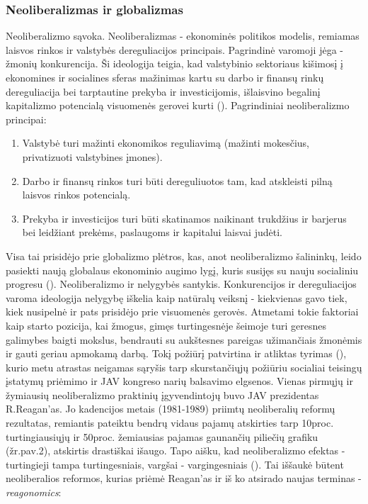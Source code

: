 \documentclass[12pt,a4paper,titlepage]{article}
\begin{document}
\subsubsection{Neoliberalizmas ir globalizmas}
Neoliberalizmo sąvoka. Neoliberalizmas - ekonominės politikos modelis, remiamas laisvos rinkos ir valstybės dereguliacijos principais. Pagrindinė varomoji jėga - žmonių konkurencija. Ši ideologija teigia, kad valstybinio sektoriaus kišimosį į ekonomines ir socialines sferas mažinimas kartu su darbo ir finansų rinkų dereguliacija bei tarptautine prekyba ir investicijomis, išlaisvino begalinį kapitalizmo potencialą visuomenės gerovei kurti (\cite{navarro2007neoliberalism}).
Pagrindiniai neoliberalizmo principai:
\begin{enumerate}
\item Valstybė turi mažinti ekonomikos reguliavimą (mažinti mokesčius, privatizuoti valstybines įmones).
\item Darbo ir finansų rinkos turi būti dereguliuotos tam, kad atskleisti pilną laisvos rinkos potencialą.
\item Prekyba ir investicijos turi būti skatinamos naikinant trukdžius ir barjerus bei leidžiant prekėms, paslaugoms ir kapitalui laisvai judėti. 
\end{enumerate}
Visa tai prisidėjo prie globalizmo plėtros, kas, anot neoliberalizmo šalininkų, leido pasiekti naują globalaus ekonominio augimo lygį, kuris susijęs su nauju socialiniu progresu (\cite{navarro2007neoliberalism}).
Neoliberalizmo ir nelygybės santykis. Konkurencijos ir dereguliacijos varoma ideologija nelygybę iškelia kaip natūralų veiksnį - kiekvienas gavo tiek, kiek nusipelnė ir pats prisidėjo prie visuomenės gerovės. Atmetami tokie faktoriai kaip starto pozicija, kai žmogus, gimęs turtingesnėje šeimoje turi geresnes galimybes baigti mokslus, bendrauti su aukštesnes pareigas užimančiais žmonėmis ir gauti geriau apmokamą darbą. Tokį požiūrį patvirtina ir atliktas tyrimas (\cite{gilens2005inequality}), kurio metu atrastas neigamas sąryšis tarp skurstančiųjų požiūriu socialiai teisingų įstatymų priėmimo ir JAV kongreso narių balsavimo elgsenos. Vienas pirmųjų ir žymiausių neoliberalizmo praktinių įgyvendintojų buvo JAV prezidentas R.Reagan'as. Jo kadencijos metais (1981-1989) priimtų neoliberalių reformų rezultatas, remiantis pateiktu bendrų vidaus pajamų atskirties tarp 10proc. turtingiausiųjų ir 50proc. žemiausias pajamas gaunančių piliečių grafiku (žr.pav.2), atskirtis drastiškai išaugo. Tapo aišku, kad neoliberalizmo efektas - turtingieji tampa turtingesniais, vargšai - vargingesniais (\cite{martinez1997neoliberalism}). Tai iššaukė būtent neoliberalios reformos, kurias priėmė Reagan'as ir iš ko atsirado naujas terminas - \textit{reagonomics}:
\end{document}
